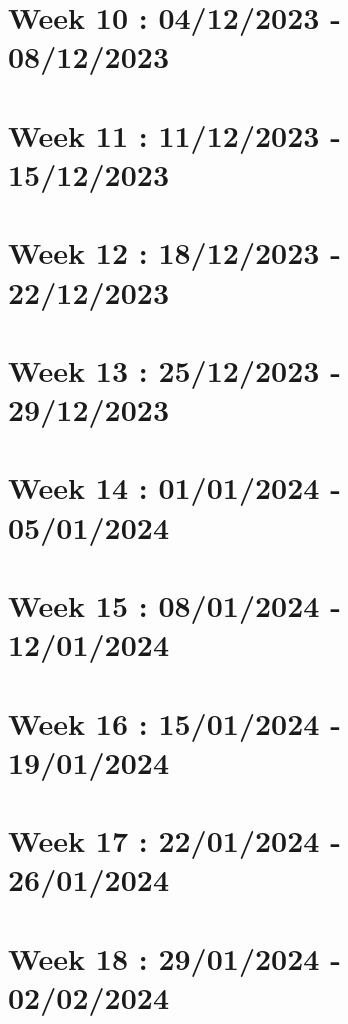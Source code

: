 \documentclass[french]{article}
\begin{document}
	\section{Week 10 : 04/12/2023 - 08/12/2023}
	

	\section{Week 11 : 11/12/2023 - 15/12/2023}
	

	\section{Week 12 : 18/12/2023 - 22/12/2023}
	

	\section{Week 13 : 25/12/2023 - 29/12/2023}
	

	\section{Week 14 : 01/01/2024 - 05/01/2024}
	

	\section{Week 15 : 08/01/2024 - 12/01/2024}
	

	\section{Week 16 : 15/01/2024 - 19/01/2024}
	

	\section{Week 17 : 22/01/2024 - 26/01/2024}
	

	\section{Week 18 : 29/01/2024 - 02/02/2024}
	
\end{document}
